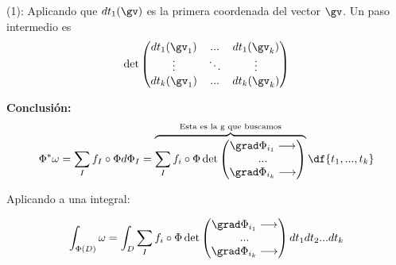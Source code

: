 (1): Aplicando que $dt_1(\gv)$ es la primera coordenada del vector $\gv$. Un paso intermedio es \[\det \begin{pmatrix}
dt_1(\gv_1) & ... & dt_1(\gv_k)\\
\vdots & \ddots & \vdots\\
dt_k(\gv_1) & ... & dt_k(\gv_k)
\end{pmatrix}\]

\textbf{Conclusión:}
\[
\Phi^{\ast} \omega = \sum_I f_I\circ\Phi d\Phi_I =
\overbrace{\sum_I f_i\circ\Phi 
\det\begin{pmatrix}
\grad \Phi_{i_1} \longrightarrow \\
...\\
\grad \Phi_{i_k} \longrightarrow 
\end{pmatrix}}^{\text{Esta es la g que buscamos}} \df{t_1,...,t_k}
\]

Aplicando a una integral:

\[\int_{\Phi(D)} \omega = \int_D \sum_I f_i\circ\Phi 
\det\begin{pmatrix}
\grad \Phi_{i_1} \longrightarrow \\
...\\
\grad \Phi_{i_k} \longrightarrow 
\end{pmatrix}dt_1dt_2...dt_k\]